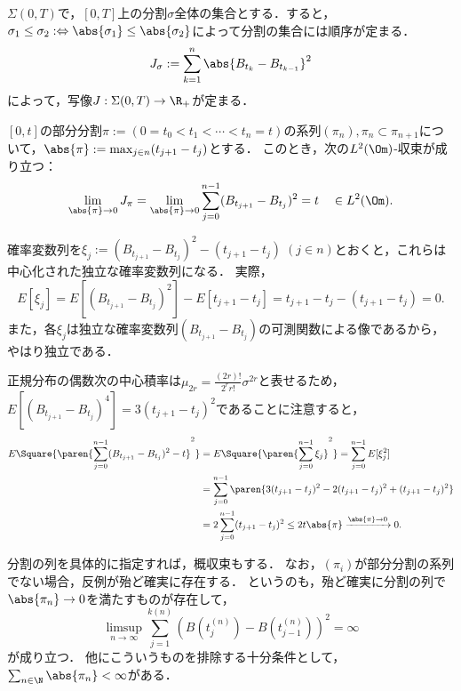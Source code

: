 \documentclass[uplatex,dvipdfmx]{jsreport}
\begin{document}
\begin{notation}
    $\Sigma(0,T)$で，$[0,T]$上の分割$\sigma$全体の集合とする．すると，$\sigma_1\le\sigma_2:\Leftrightarrow\abs{\sigma_1}\le\abs{\sigma_2}$によって分割の集合には順序が定まる．
    \[J_\sigma:=\sum_{k=1}^n\abs{B_{t_k}-B_{t_{k-1}}}^2\]
    によって，写像$J:\Sigma(0,T)\to\R_+$が定まる．
\end{notation}

\begin{proposition}[2次変動の$L^2$-収束]\label{prop-quadratic-variation-of-Brownian-motion}
    $[0,t]$の部分分割$\pi:=(0=t_0<t_1<\cdots<t_n=t)$の系列$(\pi_n),\pi_n\subset\pi_{n+1}$について，$\abs{\pi}:=\max_{j\in n}(t_{j+1}-t_j)$とする．
    このとき，次の$L^2(\Om)$-収束が成り立つ：
    \[\lim_{\abs{\pi}\to0}J_\pi=\lim_{\abs{\pi}\to0}\sum^{n-1}_{j=0}(B_{t_{j+1}}-B_{t_j})^2=t\quad\in L^2(\Om).\]
\end{proposition}
\begin{Proof}
    確率変数列を$\xi_j:=(B_{t_{j+1}}-B_{t_j})^2-(t_{j+1}-t_j)\;(j\in n)$とおくと，これらは中心化された独立な確率変数列になる．
    実際，
    \[E[\xi_j]=E[(B_{t_{j+1}}-B_{t_j})^2]-E[t_{j+1}-t_j]=t_{j+1}-t_j-(t_{j+1}-t_j)=0.\]
    また，各$\xi_j$は独立な確率変数列$(B_{t_{j+1}}-B_{t_j})$の可測関数による像であるから，やはり独立である．
    
    正規分布の偶数次の中心積率は$\mu_{2r}=\frac{(2r)!}{2^rr!}\sigma^{2r}$と表せるため，$E[(B_{t_{j+1}}-B_{t_j})^4]=3(t_{j+1}-t_j)^2$であることに注意すると，
    \begin{align*}
        E\Square{\paren{\sum^{n-1}_{j=0}(B_{t_{j+1}}-B_{t_j})^2-t}^2}&=E\Square{\paren{\sum^{n-1}_{j=0}\xi_j}^2}=\sum^{n-1}_{j=0}E[\xi^2_j]\\
        &=\sum^{n-1}_{j=0}\paren{3(t_{j+1}-t_j)^2-2(t_{j+1}-t_j)^2+(t_{j+1}-t_j)^2}\\
        &=2\sum^{n-1}_{j=0}(t_{j+1}-t_j)^2\le 2t\abs{\pi}\xrightarrow{\abs{\pi}\to0}0.
    \end{align*}
\end{Proof}
\begin{remark}[2次変動の概収束]
    分割の列を具体的に指定すれば，概収束もする．
    なお，$(\pi_i)$が部分分割の系列でない場合，反例が殆ど確実に存在する．
    というのも，殆ど確実に分割の列で$\abs{\pi_n}\to 0$を満たすものが存在して，
    \[\limsup_{n\to\infty}\sum^{k(n)}_{j=1}(B(t_j^{(n)})-B(t^{(n)}_{j-1}))^2=\infty\]
    が成り立つ．
    他にこういうものを排除する十分条件として，$\sum_{n\in\N}\abs{\pi_n}<\infty$がある．
\end{remark}
\end{document}
